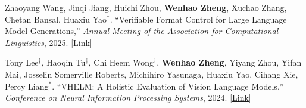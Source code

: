 \begin{cventries}
{\begin{cvitemize2}
            \vspace{1mm}
            \item Zhaoyang Wang, Jinqi Jiang, Huichi Zhou, \textbf{Wenhao Zheng}, Xuchao Zhang, Chetan Bansal, Huaxiu Yao$^*$. ``Verifiable Format Control for Large Language Model Generations,'' \textit{Annual Meeting of the Association for Computational Linguistics}, 2025. \href{https://aclanthology.org/2025.findings-naacl.194/}{\textcolor{link}{[Link]}}
            \vspace{1mm}
            \item Tony Lee$^\dagger$, Haoqin Tu$^\dagger$, Chi Heem Wong$^\dagger$, \textbf{Wenhao Zheng}, Yiyang Zhou, Yifan Mai, Josselin Somerville Roberts, Michihiro Yasunaga, Huaxiu Yao, Cihang Xie, Percy Liang$^*$. ``VHELM: A Holistic Evaluation of Vision Language Models,'' \textit{Conference on Neural Information Processing Systems}, 2024. \href{https://crfm.stanford.edu/helm/vhelm/latest/}{\textcolor{link}{[Link]}}
            \vspace{1mm}

\end{cvitemize2}}
\end{cventries}
